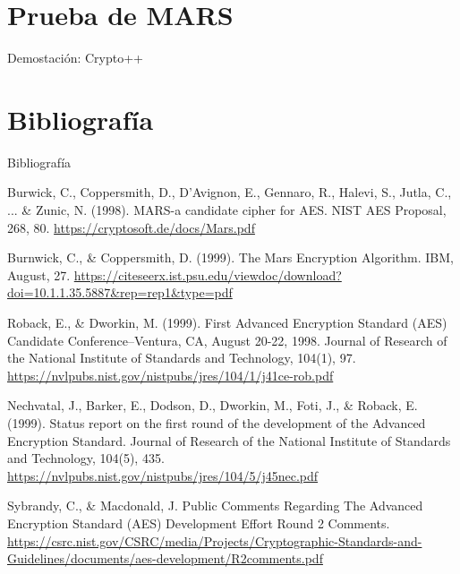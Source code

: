 \documentclass{beamer}
\begin{document}
\section{Prueba de MARS}
\begin{frame}[allowframebreaks]{Demostación: Crypto++}



\end{frame}


\section{Bibliografía}
\begin{frame}[allowframebreaks]{Bibliografía}

\scriptsize
\begin{thebibliography}{9}


	Burwick, C., Coppersmith, D., D’Avignon, E., Gennaro, R., Halevi, S., Jutla, C., ... \& Zunic, N. (1998). MARS-a candidate cipher for AES. NIST AES Proposal, 268, 80. \url{https://cryptosoft.de/docs/Mars.pdf}
	

	Burnwick, C., \& Coppersmith, D. (1999). The Mars Encryption Algorithm. IBM, August, 27. \url{https://citeseerx.ist.psu.edu/viewdoc/download?doi=10.1.1.35.5887&rep=rep1&type=pdf}



	Roback, E., \& Dworkin, M. (1999). First Advanced Encryption Standard (AES) Candidate Conference--Ventura, CA, August 20-22, 1998. Journal of Research of the National Institute of Standards and Technology, 104(1), 97. \url{https://nvlpubs.nist.gov/nistpubs/jres/104/1/j41ce-rob.pdf}


	Nechvatal, J., Barker, E., Dodson, D., Dworkin, M., Foti, J., \& Roback, E. (1999). Status report on the first round of the development of the Advanced Encryption Standard. Journal of Research of the National Institute of Standards and Technology, 104(5), 435. \url{https://nvlpubs.nist.gov/nistpubs/jres/104/5/j45nec.pdf}

	Sybrandy, C., \& Macdonald, J. Public Comments Regarding The Advanced Encryption Standard (AES) Development Effort Round 2 Comments.	\url{https://csrc.nist.gov/CSRC/media/Projects/Cryptographic-Standards-and-Guidelines/documents/aes-development/R2comments.pdf}


\end{thebibliography}
\end{frame}
\end{document}
